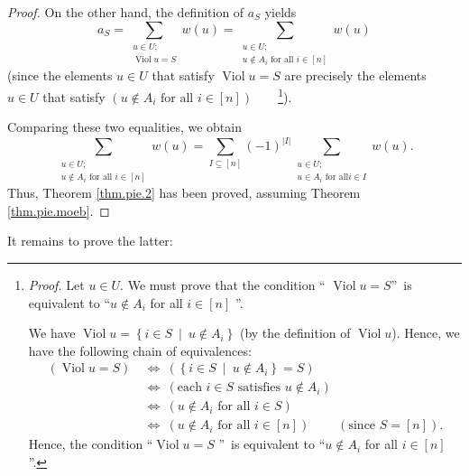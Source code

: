 \begin{proof}
On the other hand, the definition of $a_{S}$ yields%
\[
a_{S}=\sum_{\substack{u\in U;\\\operatorname*{Viol}u=S}}w\left(  u\right)
=\sum_{\substack{u\in U;\\u\notin A_{i}\text{ for all }i\in\left[  n\right]
}}w\left(  u\right)
\]
(since the elements $u\in U$ that satisfy $\operatorname*{Viol}u=S$ are
precisely the elements $u\in U$ that satisfy $\left(  u\notin A_{i}\text{ for
all }i\in\left[  n\right]  \right)  $\ \ \ \ \footnote{\textit{Proof.} Let
$u\in U$. We must prove that the condition \textquotedblleft%
$\operatorname*{Viol}u=S$\textquotedblright\ is equivalent to
\textquotedblleft$u\notin A_{i}$ for all $i\in\left[  n\right]  $%
\textquotedblright.
\par
We have $\operatorname*{Viol}u=\left\{  i\in S\ \mid\ u\notin A_{i}\right\}  $
(by the definition of $\operatorname*{Viol}u$). Hence, we have the following
chain of equivalences:%
\begin{align*}
\left(  \operatorname*{Viol}u=S\right)  \  &  \Longleftrightarrow\ \left(
\left\{  i\in S\ \mid\ u\notin A_{i}\right\}  =S\right) \\
&  \Longleftrightarrow\ \left(  \text{each }i\in S\text{ satisfies }u\notin
A_{i}\right) \\
&  \Longleftrightarrow\ \left(  u\notin A_{i}\text{ for all }i\in S\right) \\
&  \Longleftrightarrow\ \left(  u\notin A_{i}\text{ for all }i\in\left[
n\right]  \right)  \ \ \ \ \ \ \ \ \ \ \left(  \text{since }S=\left[
n\right]  \right)  .
\end{align*}
Hence, the condition \textquotedblleft$\operatorname*{Viol}u=S$%
\textquotedblright\ is equivalent to \textquotedblleft$u\notin A_{i}$ for all
$i\in\left[  n\right]  $\textquotedblright.}).

Comparing these two equalities, we obtain%
\[
\sum_{\substack{u\in U;\\u\notin A_{i}\text{ for all }i\in\left[  n\right]
}}w\left(  u\right)  =\sum_{I\subseteq\left[  n\right]  }\left(  -1\right)
^{\left\vert I\right\vert }\sum_{\substack{u\in U;\\u\in A_{i}\text{ for all
}i\in I}}w\left(  u\right)  .
\]
Thus, Theorem \ref{thm.pie.2} has been proved, assuming Theorem
\ref{thm.pie.moeb}.
\end{proof}

It remains to prove the latter:


